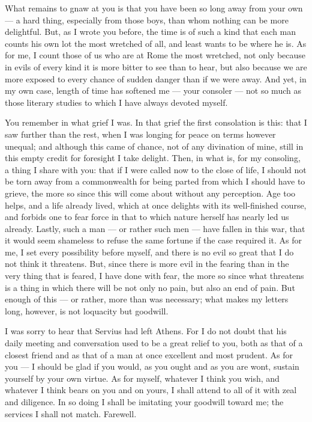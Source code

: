  What remains to gnaw at you is that you have been so long away from your own --- a hard thing, especially from those boys, than whom nothing can be more delightful. But, as I wrote you before, the time is of such a kind that each man counts his own lot the most wretched of all, and least wants to be where he is. As for me, I count those of us who are at Rome the most wretched, not only because in evils of every kind it is more bitter to see than to hear, but also because we are more exposed to every chance of sudden danger than if we were away. And yet, in my own case, length of time has softened me --- your consoler --- not so much as those literary studies to which I have always devoted myself.

 You remember in what grief I was. In that grief the first consolation is this: that I saw further than the rest, when I was longing for peace on terms however unequal; and although this came of chance, not of any divination of mine, still in this empty credit for foresight I take delight. Then, in what is, for my consoling, a thing I share with you: that if I were called now to the close of life, I should not be torn away from a commonwealth for being parted from which I should have to grieve, the more so since this will come about without any perception. Age too helps, and a life already lived, which at once delights with its well-finished course, and forbids one to fear force in that to which nature herself has nearly led us already. Lastly, such a man --- or rather such men --- have fallen in this war, that it would seem shameless to refuse the same fortune if the case required it. As for me, I set every possibility before myself, and there is no evil so great that I do not think it threatens. But, since there is more evil in the fearing than in the very thing that is feared, I have done with fear, the more so since what threatens is a thing in which there will be not only no pain, but also an end of pain. But enough of this --- or rather, more than was necessary; what makes my letters long, however, is not loquacity but goodwill.

 I was sorry to hear that Servius had left Athens. For I do not doubt that his daily meeting and conversation used to be a great relief to you, both as that of a closest friend and as that of a man at once excellent and most prudent. As for you --- I should be glad if you would, as you ought and as you are wont, sustain yourself by your own virtue. As for myself, whatever I think you wish, and whatever I think bears on you and on yours, I shall attend to all of it with zeal and diligence. In so doing I shall be imitating your goodwill toward me; the services I shall not match. Farewell.
